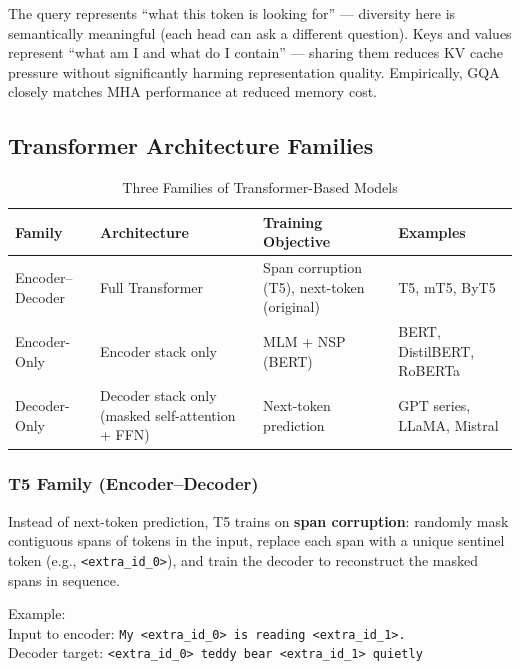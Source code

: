 \documentclass[11pt, a4paper]{article}
\begin{document}
\begin{notebox}
The query represents ``what this token is looking for'' --- diversity here is semantically meaningful (each head can ask a different question). Keys and values represent ``what am I and what do I contain'' --- sharing them reduces KV cache pressure without significantly harming representation quality. Empirically, GQA closely matches MHA performance at reduced memory cost.
\end{notebox}

\subsection{Transformer Architecture Families}

\begin{table}[h]
\centering
\caption{Three Families of Transformer-Based Models}
\begin{tabular}{@{}p{3cm}p{3cm}p{4cm}p{4cm}@{}}
\toprule
\textbf{Family} & \textbf{Architecture} & \textbf{Training Objective} & \textbf{Examples} \\
\midrule
Encoder--Decoder & Full Transformer & Span corruption (T5), next-token (original) & T5, mT5, ByT5 \\
\addlinespace
Encoder-Only & Encoder stack only & MLM + NSP (BERT) & BERT, DistilBERT, RoBERTa \\
\addlinespace
Decoder-Only & Decoder stack only (masked self-attention + FFN) & Next-token prediction & GPT series, LLaMA, Mistral \\
\bottomrule
\end{tabular}
\end{table}

\subsubsection{T5 Family (Encoder--Decoder)}

\begin{defbox}
Instead of next-token prediction, T5 trains on \textbf{span corruption}: randomly mask contiguous spans of tokens in the input, replace each span with a unique sentinel token (e.g., \texttt{<extra\_id\_0>}), and train the decoder to reconstruct the masked spans in sequence.

Example:\\
Input to encoder: \texttt{My <extra\_id\_0> is reading <extra\_id\_1>.}\\
Decoder target: \texttt{<extra\_id\_0> teddy bear <extra\_id\_1> quietly}
\end{defbox}
\end{document}
